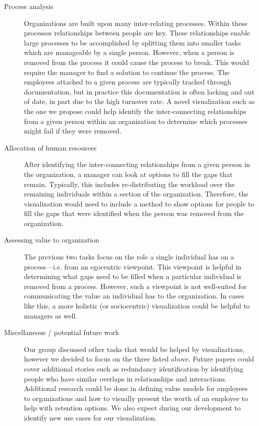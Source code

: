 \documentclass[12pt,letterpaper]{article}
\begin{document}
\begin{description}
\item [Process analysis] Organizations are built upon many inter-relating processes.  Within these processes relationships between people are key.  These relationships enable large processes to be accomplished by splitting them into smaller tasks which are manageable by a single person.  However, when a person is removed from the process it could cause the process to break.  This would require the manager to find a solution to continue the process.  The employees attached to a given process are typically tracked through documentation, but in practice this documentation is often lacking and out of date, in part due to the high turnover rate.  A novel visualization such as the one we propose could help identify the inter-connecting relationships from a given person within an organization to determine which processes might fail if they were removed.
  
\item [Allocation of human resources] After identifying the inter-connecting relationships from a given person in the organization, a manager can look at options to fill the gaps that remain.  Typically, this includes re-distributing the workload over the remaining individuals within a section of the organization.  Therefore, the visualization would need to include a method to show options for people to fill the gaps that were identified when the person was removed from the organization.
  
\item[Assessing value to organization] The previous two tasks focus on the role a single individual has on a process---i.e. from an egocentric viewpoint. This viewpoint is helpful in determining what gaps need to be filled when a particular individual is removed from a process. However, such a viewpoint is not well-suited for communicating the value an individual has to the organization. In cases like this, a more holistic (or sociocentric) visualization could be helpful to managers as well. 
  
\item [Miscellaneous / potential future work]Our group discussed other tasks that would be helped by visualizations, however we decided to focus on the three listed above.  Future papers could cover additional stories such as redundancy identification by identifying people who have similar overlaps in relationships and interactions.  Additional research could be done in defining value models for employees to organizations and how to visually present the worth of an employee to help with retention options.  We also expect during our development to identify new use cases for our visualization.  
\end{description}
\end{document}

